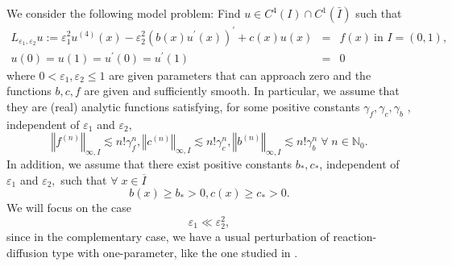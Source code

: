 \documentclass[12pt]{article}
\begin{document}
We consider the following model problem: Find $u \in C^4(I) \cap C^1(\bar{I})$ such that 
\begin{eqnarray}
L_{\varepsilon_1, \varepsilon_2} u := \varepsilon _{1}^{2}u^{(4)}(x)-\varepsilon _{2}^{2}\left( b(x)u^{\prime
}(x)\right) ^{\prime }+c(x)u(x) &=&f(x)\ \text{in }I=\left( 0,1\right) ,
\label{de} \\
u(0)=u(1)=u^{\prime }(0)=u^{\prime }(1) &=&0  \label{bc}
\end{eqnarray}%
where $0<\varepsilon _{1},\varepsilon _{2}\leq 1$ are given parameters that
can approach zero and the functions $b,c,f$ are given and sufficiently
smooth. In particular, we assume that they are (real) analytic functions
satisfying, for some positive constants $\gamma _{f},\gamma _{c},\gamma _{b}$%
, independent of $\varepsilon _{1}$ and $\varepsilon _{2},$%
\begin{equation}
\left\Vert f^{(n)}\right\Vert _{\infty ,I}\lesssim n!\gamma
_{f}^{n},\left\Vert c^{(n)}\right\Vert _{\infty ,I}\lesssim n!\gamma
_{c}^{n},\left\Vert b^{(n)}\right\Vert _{\infty ,I}\lesssim n!\gamma
_{b}^{n}\;\forall \;n\in \mathbb{N}_{0}.  \label{analytic}
\end{equation}%
In addition, we assume that there exist positive constants $b_* ,c_*$,
independent of $\varepsilon _{1}$ and $\varepsilon _{2},$ such that $\forall
\;x\in \overline{I}$ 
\begin{equation}
b(x)\geq b_* >0,c(x)\geq c_*>0.  \label{data}
\end{equation}%
We will focus on the case 
\begin{equation}
\varepsilon _{1} \ll \varepsilon _{2}^{2},  \label{eps_relation}
\end{equation}%
since in the complementary case, we have a usual perturbation of
reaction-diffusion type with one-parameter, like the one studied in \cite{PCarXiv}.
\end{document}
